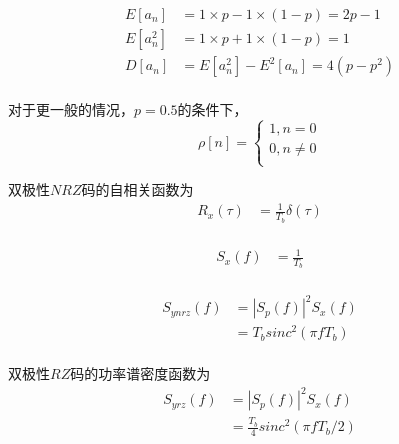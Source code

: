\documentclass[
]{article}
\begin{document}
\begin{equation}
\begin{aligned}
E[a_n] &= 1\times p - 1\times(1-p)=2p-1\\
E[a_n^2] &= 1\times p + 1\times(1-p)=1\\
D[a_n] &= E[a_n^2] - E^2[a_n]=4(p-p^2)\\
\end{aligned}
\end{equation}

对于更一般的情况，$p = 0.5$的条件下，
\begin{equation}
\rho[n] =\left\{
\begin{aligned}
1, n = 0\\
0, n \neq 0 \\
\end{aligned}
\right.
\end{equation}

双极性$NRZ$码的自相关函数为\\
\begin{equation}
\begin{aligned}
R_{x}(\tau) &= \frac{1}{T_b} \delta(\tau)\\
\end{aligned}
\end{equation}

\begin{equation}
\begin{aligned}
S_{x}(f) &= \frac{1}{T_b}\\
\end{aligned}
\end{equation}

\begin{equation}
\begin{aligned}
S_{ynrz}(f) &= {\left| S_p(f) \right|}^2 S_x(f) \\
&= T_b sinc^2(\pi f T_b) \\
\end{aligned}
\end{equation}

双极性$RZ$码的功率谱密度函数为\\
\begin{equation}
\begin{aligned}
S_{yrz}(f) &= {\left| S_p(f) \right|}^2 S_x(f) \\
&= \frac{T_b}{4} sinc^2(\pi f T_b/2) \\
\end{aligned}
\end{equation}
\end{document}
